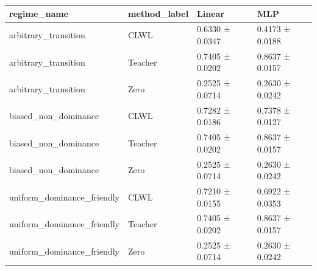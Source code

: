 \begin{tabular}{llll}
\toprule
regime_name & method_label & Linear & MLP \\
\midrule
arbitrary_transition & CLWL & 0.6330 ± 0.0347 & 0.4173 ± 0.0188 \\
arbitrary_transition & Teacher & 0.7405 ± 0.0202 & 0.8637 ± 0.0157 \\
arbitrary_transition & Zero & 0.2525 ± 0.0714 & 0.2630 ± 0.0242 \\
biased_non_dominance & CLWL & 0.7282 ± 0.0186 & 0.7378 ± 0.0127 \\
biased_non_dominance & Teacher & 0.7405 ± 0.0202 & 0.8637 ± 0.0157 \\
biased_non_dominance & Zero & 0.2525 ± 0.0714 & 0.2630 ± 0.0242 \\
uniform_dominance_friendly & CLWL & 0.7210 ± 0.0155 & 0.6922 ± 0.0353 \\
uniform_dominance_friendly & Teacher & 0.7405 ± 0.0202 & 0.8637 ± 0.0157 \\
uniform_dominance_friendly & Zero & 0.2525 ± 0.0714 & 0.2630 ± 0.0242 \\
\bottomrule
\end{tabular}

